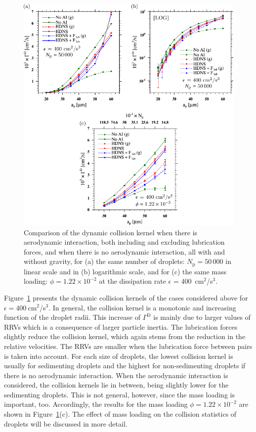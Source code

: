 \documentclass[../thesis.tex]{subfiles}
\begin{document}
\begin{figure}%
\center
\includegraphics[width=\textwidth]{../figs/JFM/fig15.pdf}
\caption{Comparison of the dynamic collision kernel when there is aerodynamic interaction, both including and excluding lubrication forces, and when there is no aerodynamic interaction, all with and without gravity, for (a) the same number of droplets: $N_\mathrm{p} = 50\,000$ in linear scale and in (b) logarithmic scale, and for (c) the same mass loading: $\phi = 1.22\times10^{-2}$ at the dissipation rate $\epsilon$ = 400~cm$^2$/s$^3$.}
\label{Fig15}
\end{figure}%

Figure~\ref{Fig15} presents the dynamic collision kernels of the cases considered above for $\epsilon = 400~$cm$^2$/s$^3$. In general, the collision kernel is a monotonic and increasing function of the droplet radii. This increase of $\Gamma^\text{D}$ is mainly due to larger values of RRVs which is a consequence of larger particle inertia. The lubrication forces slightly reduce the collision kernel, which again stems from the reduction in the relative velocities. The RRVs are smaller when the lubrication force between pairs is taken into account. For each size of droplets, the lowest collision kernel is usually for sedimenting droplets and the highest for non-sedimenting droplets if there is no aerodynamic interaction. When the aerodynamic interaction is considered, the collision kernels lie in between, being slightly lower for the sedimenting droplets. This is not general, however, since the mass loading is important, too. Accordingly, the results for the mass loading $\phi = 1.22\times10^{-2}$ are shown in Figure~\ref{Fig15}(c). The effect of mass loading on the collision statistics of droplets will be discussed in more detail.
\end{document}
